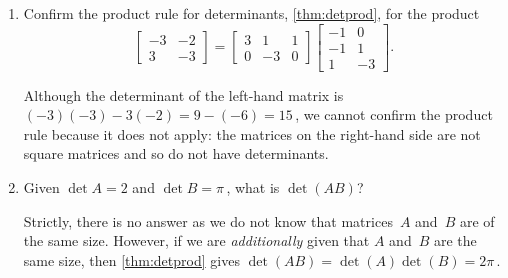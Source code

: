 \begin{example} \label{eg:}
\begin{enumerate}
\item\label{eg:baddets} Confirm the product rule for determinants, \autoref{thm:detprod}, for the product
\begin{equation*}
\begin{bmatrix} -3&-2\\3&-3 \end{bmatrix}
=\begin{bmatrix} 3&1&1\\0&-3&0 \end{bmatrix}
\begin{bmatrix} -1&0\\-1&1\\1&-3 \end{bmatrix}.
\end{equation*}
\begin{solution} 
Although the determinant of the left-hand matrix is \((-3)(-3)-3(-2)=9-(-6)=15\)\,, we cannot confirm the product rule because it does not apply: the matrices on the right-hand side are not square matrices and so do not have determinants.
\end{solution}

\item Given \(\det A=2\) and \(\det B=\pi\)\,, what is \(\det(AB)\)?
\begin{solution} 
Strictly, there is no answer as we do not know that matrices~\(A\) and~\(B\) are of the same size.
However, if we are \emph{additionally} given that \(A\) and~\(B\) are the same size, then \autoref{thm:detprod} gives \(\det(AB)=\det(A)\det(B)=2\pi\)\,.
\end{solution}
\end{enumerate}
\end{example}



